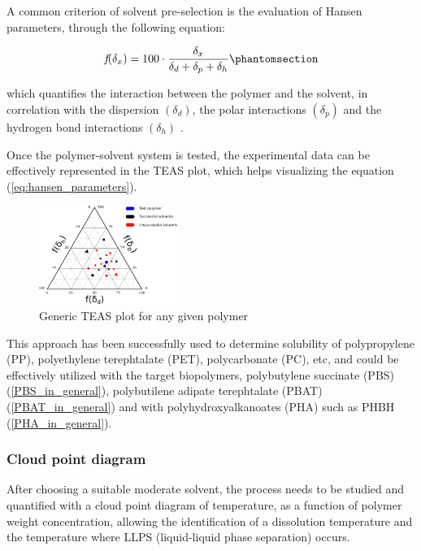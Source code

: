 \documentclass{article}
\begin{document}
    A common criterion of solvent pre-selection is the evaluation of Hansen parameters, through the following equation: 

    \begin{equation}
        \textit{f} (\delta_x) = 100 \cdot \frac{\delta_x}{\delta_d + \delta_p + \delta_h}
        \phantomsection
        \label{eq:hansen_parameters}
    \end{equation}

    which quantifies the interaction between the polymer and the solvent, in correlation with the dispersion $(\delta_d)$, 
    the polar interactions $(\delta_p)$ and the hydrogen bond interactions $(\delta_h)$ \autocite*{DechetMaximilianA2020OtDo}. 

    Once the polymer-solvent system is tested, the experimental data can be effectively represented in the TEAS plot, which 
    helps visualizing the equation (\ref{eq:hansen_parameters}). 

    \begin{figure}[h!]
        \centering
        \includegraphics[width=0.4\textwidth]{Pictures/TEAS_plot.eps}
        \caption{Generic TEAS plot for any given polymer \autocites{DechetMaximilianA2020OtDo}{Inkscape}}
        \label{fig:TEAS_plot}
    \end{figure}


    This approach has been successfully used to determine solubility of polypropylene (PP), polyethylene terephtalate (PET), 
    polycarbonate (PC), etc, and could be effectively utilized with the target biopolymers, polybutylene succinate (PBS)
    (\ref{PBS_in_general}), 
    polybutilene adipate terephtalate (PBAT) (\ref{PBAT_in_general}) and with polyhydroxyalkanoates (PHA) such as PHBH (\ref{PHA_in_general}).
    
    

    \subsubsection{Cloud point diagram \label{Cloud_point_diagram}}

    After choosing a suitable moderate solvent, the process needs to be studied and quantified 
    with a cloud point diagram of temperature, as a function of polymer weight concentration, allowing the identification of a dissolution 
    temperature and the temperature where LLPS (liquid-liquid phase separation) occurs. 
    
\end{document}
